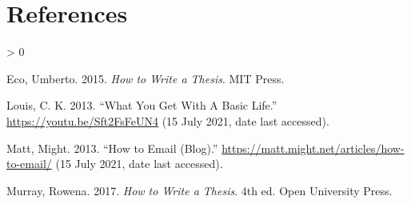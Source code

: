 \documentclass[
  12pt,
]{book}
\newlength{\cslhangindent}
\newenvironment{CSLReferences}[2] %
 {%
  \setlength{\parindent}{0pt}
  \ifodd #1 \everypar{\setlength{\hangindent}{\cslhangindent}}\ignorespaces\fi
  \ifnum #2 > 0
  \setlength{\parskip}{#2\baselineskip}
  \fi
 }%
 {}
\begin{document}
\hypertarget{references}{%
\chapter*{References}\label{references}}

\hypertarget{refs}{}
\begin{CSLReferences}{1}{0}
\leavevmode\hypertarget{ref-Eco2015}{}%
Eco, Umberto. 2015. \emph{{How to Write a Thesis}}. MIT Press.

\leavevmode\hypertarget{ref-BasicCable-LCK}{}%
Louis, C. K. 2013. {``{What You Get With A Basic Life}.''} \url{https://youtu.be/Sft2FsFeUN4} (15 July 2021, date last accessed).

\leavevmode\hypertarget{ref-email-MattMight}{}%
Matt, Might. 2013. {``{How to Email (Blog)}.''} \url{https://matt.might.net/articles/how-to-email/} (15 July 2021, date last accessed).

\leavevmode\hypertarget{ref-Murray2017}{}%
Murray, Rowena. 2017. \emph{{How to Write a Thesis}}. 4th ed. Open University Press.

\end{CSLReferences}
\end{document}
